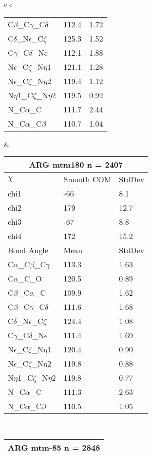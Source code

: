 \begin{longtable}{ c c }
\begin{tabular}{ l l l }
  C$\beta$\_C$\gamma$\_C$\delta$ & 112.4 & 1.72\\
  C$\delta$\_N$\epsilon$\_C$\zeta$ & 125.3 & 1.52\\
  C$\gamma$\_C$\delta$\_N$\epsilon$ & 112.1 & 1.88\\
  N$\epsilon$\_C$\zeta$\_N$\eta$1 & 121.1 & 1.28\\
  N$\epsilon$\_C$\zeta$\_N$\eta$2 & 119.4 & 1.12\\
  N$\eta$1\_C$\zeta$\_N$\eta$2 & 119.5 & 0.92\\
  N\_C$\alpha$\_C & 111.7 & 2.44\\
  N\_C$\alpha$\_C$\beta$ & 110.7 & 1.04\\
  \bottomrule
  \end{tabular}
  &
  \begin{tabular}{ l l l }
  \toprule
  \multicolumn{3}{c}{ARG \textbf{mtm180} n = 2407} \\ \toprule
  $\chi$       & Smooth COM & StdDev \\ \midrule
  chi1 & -66 & 8.1 \\ 
  chi2 & 179 & 12.7 \\ 
  chi3 & -67 & 8.8 \\ 
  chi4 & 172 & 15.2 \\ \midrule
  Bond Angle   & Mean     & StdDev \\ \midrule
  C$\alpha$\_C$\beta$\_C$\gamma$ & 113.3 & 1.63\\
  C$\alpha$\_C\_O & 120.5 & 0.89\\
  C$\beta$\_C$\alpha$\_C & 109.9 & 1.62\\
  C$\beta$\_C$\gamma$\_C$\delta$ & 111.6 & 1.68\\
  C$\delta$\_N$\epsilon$\_C$\zeta$ & 124.4 & 1.08\\
  C$\gamma$\_C$\delta$\_N$\epsilon$ & 111.4 & 1.69\\
  N$\epsilon$\_C$\zeta$\_N$\eta$1 & 120.4 & 0.90\\
  N$\epsilon$\_C$\zeta$\_N$\eta$2 & 119.8 & 0.88\\
  N$\eta$1\_C$\zeta$\_N$\eta$2 & 119.8 & 0.77\\
  N\_C$\alpha$\_C & 111.3 & 2.63\\
  N\_C$\alpha$\_C$\beta$ & 110.5 & 1.05\\
  \bottomrule
  \end{tabular}
  \\
  \begin{tabular}{ l l l }
  \toprule
  \multicolumn{3}{c}{ARG \textbf{mtm-85} n = 2848} \\ \toprule

\end{tabular}
\end{longtable}

